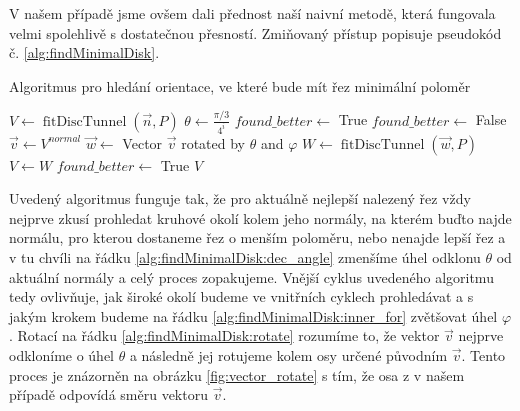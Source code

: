 V našem případě jsme ovšem dali přednost naší naivní metodě, která
fungovala velmi spolehlivě s dostatečnou přesností. Zmiňovaný přístup popisuje
pseudokód č. \ref{alg:findMinimalDisk}.


\begin{algorithm}
\caption{Algoritmus pro hledání orientace, ve které bude mít řez minimální poloměr}
\label{alg:findMinimalDisk}
\begin{algorithmic}[1]


    \State $ V  \gets \operatorname{fitDiscTunnel}(\vec{n}, P) $
        \State $ \theta \gets \frac{\pi / 3}{4^i} $ \label{alg:findMinimalDisk:dec_angle}
        \State $ found\_better \gets $ True
            \State $ found\_better \gets $ False
            \State $ \vec{v} \gets V^{normal} $
             \label{alg:findMinimalDisk:inner_for}
                \State $ \vec{w} \gets$ Vector $\vec{v} $ rotated by $ \theta $ and $\varphi $ \label{alg:findMinimalDisk:rotate}
                \State $ W \gets \operatorname{fitDiscTunnel}(\vec{w}, P) $
                  \label{alg:findMinimalDisk:if}
                    \State $ V \gets W $
                    \State $ found\_better \gets $ True
                \EndIf
            \EndFor
        \EndWhile
    \EndFor
    \State \Return $V$
\EndFunction

\end{algorithmic}
\end{algorithm}

Uvedený algoritmus funguje tak, že pro aktuálně nejlepší nalezený řez vždy nejprve
zkusí prohledat kruhové okolí kolem jeho normály, na kterém buďto najde normálu,
pro kterou dostaneme řez o menším poloměru, nebo nenajde lepší řez a v tu chvíli
na řádku \ref{alg:findMinimalDisk:dec_angle} zmenšíme úhel odklonu $ \theta $
od aktuální normály a celý proces zopakujeme.
Vnější cyklus uvedeného algoritmu tedy ovlivňuje, jak široké okolí budeme ve vnitřních
cyklech prohledávat a s jakým krokem budeme na řádku \ref{alg:findMinimalDisk:inner_for}
zvětšovat úhel $\varphi $. Rotací na řádku \ref{alg:findMinimalDisk:rotate} rozumíme to,
že vektor $\vec{v} $ nejprve odkloníme o úhel $ \theta $ a následně jej rotujeme
kolem osy určené původním $\vec{v} $. Tento proces je znázorněn na obrázku
\ref{fig:vector_rotate} s tím, že osa z v našem případě odpovídá směru vektoru
$\vec{v} $.

